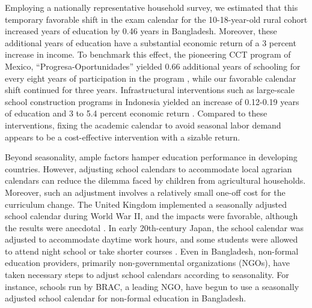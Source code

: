 \documentclass[12pt,letterpaper]{article}
\newcommand{\0}{\ensuremath{\mbox{\boldmath $0$}}}
\begin{document}
Employing a nationally representative household survey, we estimated that this temporary favorable shift in the exam calendar for the 10-18-year-old rural cohort increased years of education by 0.46 years in Bangladesh. Moreover, these additional years of education have a substantial economic return of a 3 percent increase in income. To benchmark this effect, the pioneering CCT program of Mexico, ``Progresa-Oportunidades'' yielded 0.66 additional years of schooling for every eight years of participation in the program \citep{reimers2006education}, while our favorable calendar shift continued for three years. Infrastructural interventions such as large-scale school construction programs in Indonesia yielded an increase of 0.12-0.19 years of education and 3 to 5.4 percent economic return \citep{duflo2001schooling}. Compared to these interventions, fixing the academic calendar to avoid seasonal labor demand appears to be a cost-effective intervention with a sizable return.

Beyond seasonality, ample factors hamper education performance in developing countries. However, adjusting school calendars to accommodate local agrarian calendars can reduce the dilemma faced by children from agricultural households. Moreover, such an adjustment involves a relatively small one-off cost for the curriculum change. The United Kingdom implemented a seasonally adjusted school calendar during World War II, and the impacts were favorable, although the results were anecdotal \citep[][190-191]{Moore2004}. In early 20th-century Japan, the school calendar was adjusted to accommodate daytime work hours, and some students were allowed to attend night school or take shorter courses \citep[][Chapter 3]{JICA2004}. Even in Bangladesh, non-formal education providers, primarily non-governmental organizations (NGOs), have taken necessary steps to adjust school calendars according to seasonality. For instance, schools run by BRAC, a leading NGO, have begun to use a seasonally adjusted school calendar for non-formal education in Bangladesh.
\end{document}

